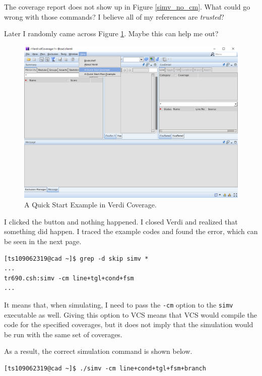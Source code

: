 \documentclass{article}
\begin{document}
The coverage report does not show up in Figure \ref{simv_no_cm}. What could go wrong with those commands? I believe all of my references are \textit{trusted}?

Later I randomly came across Figure \ref{A Quick Start Example}. Maybe this can help me out?

\begin{figure}[t] \centering
\includegraphics[width=\textwidth]{A Quick Start Example}
\caption{A Quick Start Example in Verdi Coverage.}
\label{A Quick Start Example}
\end{figure}

I clicked the button and nothing happened. I closed Verdi and realized that something did happen. I traced the example codes and found the error, which can be seen in the next page.

\newpage

\begin{verbatim}
[ts109062319@cad ~]$ grep -d skip simv *
...
tr690.csh:simv -cm line+tgl+cond+fsm
...
\end{verbatim}

It means that, when simulating, I need to pass the \verb|-cm| option to the \verb|simv| executable as well. Giving this option to VCS means that VCS would compile the code for the specified coverages, but it does not imply that the simulation would be run with the same set of coverages.

As a result, the correct simulation command is shown below.

\begin{verbatim}
[ts109062319@cad ~]$ ./simv -cm line+cond+tgl+fsm+branch
\end{verbatim}
\end{document}
